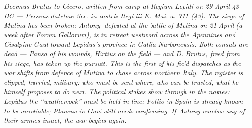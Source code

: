 
\textit{Decimus Brutus to Cicero, written from camp at Regium Lepidi on 29 April 43 BC --- Perseus dateline \textit{Scr. in castris Regi iii K. Mai. a. 711 (43)}. The siege of Mutina has been broken; Antony, defeated at the battle of Mutina on 21 April (a week after Forum Gallorum), is in retreat westward across the Apennines and Cisalpine Gaul toward Lepidus's province in Gallia Narbonensis. Both consuls are dead --- Pansa of his wounds, Hirtius on the field --- and D. Brutus, freed from his siege, has taken up the pursuit. This is the first of his field dispatches as the war shifts from defence of Mutina to chase across northern Italy. The register is clipped, hurried, military: who must be sent where, who can be trusted, what he himself proposes to do next. The political stakes show through in the names: Lepidus the ``weathercock'' must be held in line; Pollio in Spain is already known to be unreliable; Plancus in Gaul still needs confirming. If Antony reaches any of their armies intact, the war begins again.}
